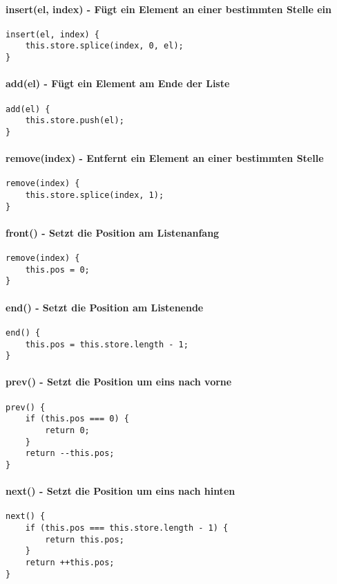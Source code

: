 \documentclass[babel]{book}
\begin{document}
\paragraph{insert(el, index) - Fügt ein Element an einer bestimmten Stelle ein} 
\begin{lstlisting}[caption=Array Konstruktor]
insert(el, index) {
	this.store.splice(index, 0, el);
}
\end{lstlisting}

\paragraph{add(el) - Fügt ein Element am Ende der Liste}
\begin{lstlisting}[caption=Array Konstruktor]
add(el) {
	this.store.push(el);
}
\end{lstlisting}
\paragraph{remove(index) - Entfernt ein Element an einer bestimmten Stelle}
\begin{lstlisting}[caption=Array Konstruktor]
remove(index) {
	this.store.splice(index, 1);
}
\end{lstlisting}
\paragraph{front() - Setzt die Position am Listenanfang}
\begin{lstlisting}[caption=Array Konstruktor]
remove(index) {
	this.pos = 0;
}
\end{lstlisting}
\paragraph{end() - Setzt die Position am Listenende}
\begin{lstlisting}[caption=Array Konstruktor]
end() {
	this.pos = this.store.length - 1;
}
\end{lstlisting}

\paragraph{prev() - Setzt die Position um eins nach vorne}
\begin{lstlisting}[caption=Array Konstruktor]
prev() {
	if (this.pos === 0) {
		return 0;
	}
	return --this.pos;
}
\end{lstlisting}
\paragraph{next() - Setzt die Position um eins nach hinten}
\begin{lstlisting}[caption=Array Konstruktor]
next() {
	if (this.pos === this.store.length - 1) {
		return this.pos;
	}
	return ++this.pos;
}
\end{lstlisting}
\end{document}
